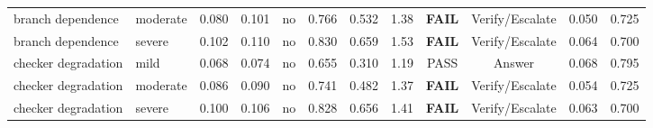 \begin{table}[!ht]
{\begin{tabular}{llcccccccccc}
branch dependence & moderate & 0.080 & 0.101 & no & 0.766 & 0.532 & 1.38 & \textbf{FAIL} & Verify/Escalate & 0.050 & 0.725 \\
branch dependence & severe & 0.102 & 0.110 & no & 0.830 & 0.659 & 1.53 & \textbf{FAIL} & Verify/Escalate & 0.064 & 0.700 \\
checker degradation & mild & 0.068 & 0.074 & no & 0.655 & 0.310 & 1.19 & PASS & Answer & 0.068 & 0.795 \\
checker degradation & moderate & 0.086 & 0.090 & no & 0.741 & 0.482 & 1.37 & \textbf{FAIL} & Verify/Escalate & 0.054 & 0.725 \\
checker degradation & severe & 0.100 & 0.106 & no & 0.828 & 0.656 & 1.41 & \textbf{FAIL} & Verify/Escalate & 0.063 & 0.700 \\
\bottomrule
\end{tabular}}
\end{table}